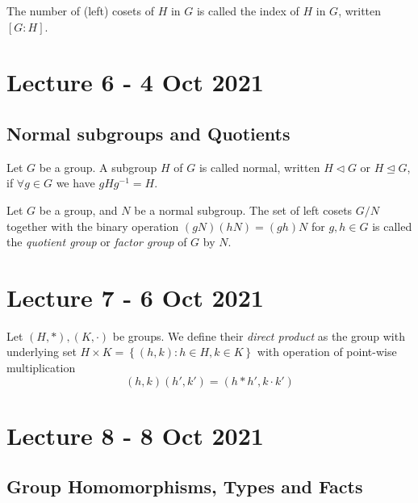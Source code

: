 \documentclass[11pt]{scrartcl}
\begin{document}
\begin{definition}
  The number of (left) cosets of $H$ in $G$ is called the index of $H$ in $G$, written
  $[G:H]$.
\end{definition}

\section{Lecture 6 - 4 Oct 2021}

\subsection{Normal subgroups and Quotients}

\begin{definition}
  Let $G$ be a group. A subgroup $H$ of $G$ is called normal, written $H\triangleleft G$
  or $H\trianglelefteq G$, if $\forall g\in G$ we have $gHg^{-1}=H$.
  \label{normalSubgroup}
\end{definition}

\begin{definition}
  Let $G$ be a group, and $N$ be a normal subgroup. The set of left cosets $G/N$ together
  with the binary operation $(gN)(hN)=(gh)N$ for $g,h\in G$ is called the \emph{quotient
  group} or \emph{factor group} of $G$ by $N$.
  \label{quotientGroup}
\end{definition}

\section{Lecture 7 - 6 Oct 2021}

\begin{definition}
  Let $(H,*),(K,\cdot)$ be groups. We define their \emph{direct product} as the group
  with underlying set $H\times K = \left\{ (h,k) : h\in H, k\in K \right\}$ with operation
  of point-wise multiplication
  \[(h,k)(h',k')=(h*h',k\cdot k')\]
  \label{directProduct}
\end{definition}

\section{Lecture 8 - 8 Oct 2021}

\subsection{Group Homomorphisms, Types and Facts}
\end{document}
